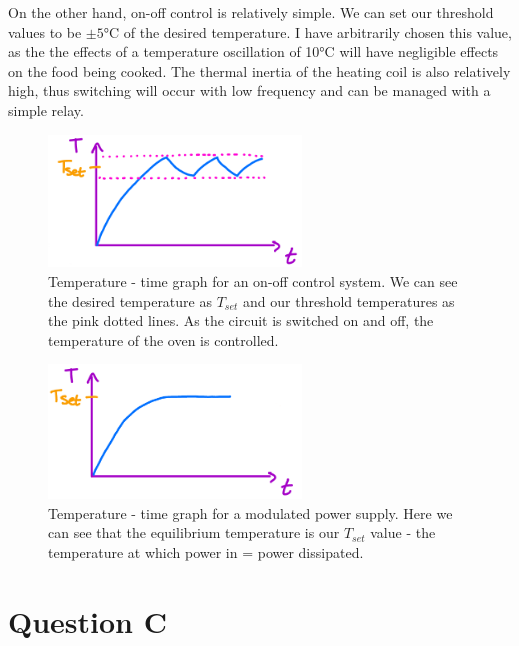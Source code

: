 \documentclass[12pt]{article}
\numberwithin{equation}{section}
\begin{document}
On the other hand, on-off control is relatively simple. We can set our threshold values to be $\pm 5\si{\celsius}$ of the desired temperature. I have arbitrarily chosen this value, as the the effects of a temperature oscillation of 10\si{\celsius} will have negligible effects on the food being cooked. The thermal inertia of the heating coil is also relatively high, thus switching will occur with low frequency and can be managed with a simple relay.
\begin{figure}[H]
  \centering
  \includegraphics[width=0.6\textwidth]{./img/2-2graph.png}
  \caption{Temperature - time graph for an on-off control system. We can see the desired temperature as $T_{set}$ and our threshold temperatures as the pink dotted lines. As the circuit is switched on and off, the temperature of the oven is controlled.}
\end{figure}
\begin{figure}[H]
  \centering
  \includegraphics[width=0.6\textwidth]{./img/2-3graph.png}
  \caption{Temperature - time graph for a modulated power supply. Here we can see that the equilibrium temperature is our $T_{set}$ value - the temperature at which power in = power dissipated.}
\end{figure}
\section{Question C}
\end{document}
